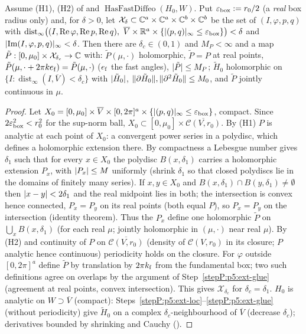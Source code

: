 \begin{lemma}\label{bpP:p5:ext}
Assume (H1), (H2) of  and $\operatorname{HasFastDiffeo}(H_0,W)$. Put $\varepsilon_{\rm box}:=r_0/2$ (a \emph{real} box radius only) and, for $\delta>0$, let $\mathcal X_\delta\subset\mathbb{C}^a\times\mathbb{C}^a\times\mathbb{C}^b\times\mathbb{C}^b$ be the set of $(I,\varphi,p,q)$ with $\operatorname{dist}_\infty\bigl((I,\operatorname{Re}\varphi,\operatorname{Re}p,\operatorname{Re}q),\ \overline V\times\R^a\times\{\abs{(p,q)}_\infty\le\varepsilon_{\rm box}\}\bigr)<\delta$ and $\lvert \operatorname{Im}(I,\varphi,p,q)\rvert_\infty<\delta$. Then there are $\delta_c\in(0,1)$ and $M_P<\infty$ and a map $\tilde P:[0,\mu_0]\times\mathcal X_{\delta_c}\to\mathbb{C}$ with: $\tilde P(\mu,\cdot)$ holomorphic, $\tilde P=P$ at real points, $\tilde P(\mu,\cdot+2\pi k e_{\rm f})=\tilde P(\mu,\cdot)$ ($e_{\rm f}$ the fast angles), $\lvert \tilde P\rvert\le M_P$; $\tilde H_0$ holomorphic on $\{I:\operatorname{dist}_\infty(I,\overline V)<\delta_c\}$ with $\lvert \tilde H_0\rvert$, $\lVert \partial\tilde H_0\rVert,\lVert \partial^2\tilde H_0\rVert\le M_0$, and $\tilde P$ jointly continuous in $\mu$.
\end{lemma}
\begin{proof}
\label{stepP:p5:ext-loc} Let $X_0=[0,\mu_0]\times\overline V\times[0,2\pi]^a\times\{\lvert (p,q)\rvert_\infty\le\varepsilon_{\rm box}\}$, compact. Since $2\varepsilon_{\rm box}^2<r_0^2$ for the sup-norm ball, $X_0\subset[0,\mu_0]\times\overline{\mathcal C(V,r_0)}$. By (H1) $P$ is analytic at each point of $X_0$: a convergent power series in a polydisc, which defines a holomorphic extension there. By compactness a Lebesgue number gives $\delta_1$ such that for every $x\in X_0$ the polydisc $B(x,\delta_1)$ carries a holomorphic extension $P_x$, with $\lvert P_x\rvert\le M$ uniformly (shrink $\delta_1$ so that closed polydiscs lie in the domains of finitely many series).
\label{stepP:p5:ext-glue} If $x,y\in X_0$ and $B(x,\delta_1)\cap B(y,\delta_1)\ne\emptyset$ then $\lvert x-y\rvert<2\delta_1$ and the real midpoint lies in both; the intersection is convex hence connected, $P_x=P_y$ on its real points (both equal $P$), so $P_x=P_y$ on the intersection (identity theorem). Thus the $P_x$ define one holomorphic $\tilde P$ on $\bigcup_xB(x,\delta_1)$ (for each real $\mu$; jointly holomorphic in $(\mu,\cdot)$ near real $\mu$).
\label{stepP:p5:ext-per} By (H2) and continuity of $P$ on $\overline{\mathcal C(V,r_0)}$ (density of $\mathcal C(V,r_0)$ in its closure; $P$ analytic hence continuous) periodicity holds on the closure. For $\varphi$ outside $[0,2\pi]^a$ define $\tilde P$ by translation by $2\pi k_{\rm f}$ from the fundamental box; two such definitions agree on overlaps by the argument of Step~\ref{stepP:p5:ext-glue} (agreement at real points, convex intersection). This gives $\mathcal X_{\delta_c}$ for $\delta_c=\delta_1$.
\label{stepP:p5:ext-H0} $H_0$ is analytic on $W\supset\overline V$ (compact): Steps~\ref{stepP:p5:ext-loc}--\ref{stepP:p5:ext-glue} (without periodicity) give $\tilde H_0$ on a complex $\delta_c$-neighbourhood of $\overline V$ (decrease $\delta_c$); derivatives bounded by shrinking and Cauchy ().
\end{proof}

